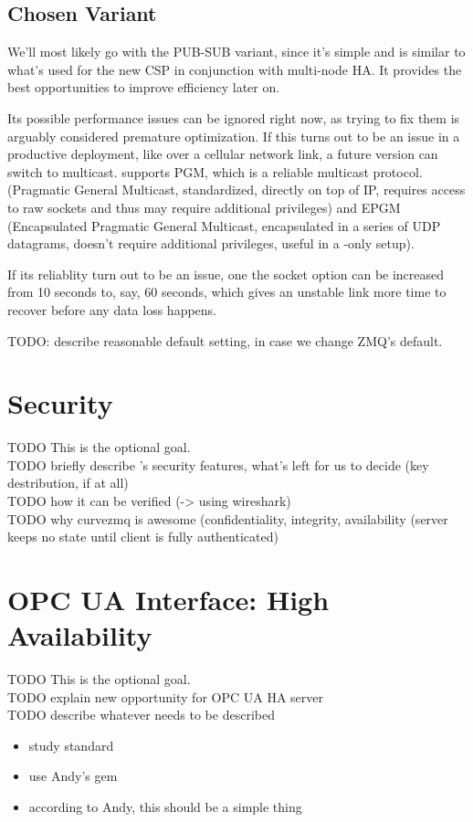\subsection{Chosen Variant}
We'll most likely go with the PUB-SUB variant, since it's simple and is similar to
what's used for the new CSP in conjunction with multi-node HA. It provides the best
opportunities to improve efficiency later on.

Its possible performance issues can be ignored right now, as trying to fix them
is arguably considered premature optimization. If this turns out to be an issue
in a productive deployment, like over a cellular network link, a future version
can switch to multicast. \zmq supports PGM, which is a reliable multicast
protocol. (Pragmatic General Multicast, standardized, directly on top of IP,
requires access to raw sockets and thus may require additional privileges) and
EPGM (Encapsulated Pragmatic General Multicast, encapsulated in a series of UDP
datagrams, doesn't require additional privileges, useful in a \zmq-only setup).

If its reliablity turn out to be an issue, one the socket option
 can be increased from 10 seconds to, say, 60 seconds, which
gives an unstable link more time to recover before any data loss happens.

TODO: describe reasonable default setting, in case we change ZMQ's default.


\section{Security}\label{sec:meth:security}
TODO This is the optional goal.\\
TODO briefly describe \zmq's security features, what's left for us to decide (key destribution, if at all)\\
TODO how it can be verified (-> using wireshark)\\
TODO why curvezmq is awesome (confidentiality, integrity, availability (server keeps no state until client is fully authenticated)




\section{OPC UA Interface: High Availability}\label{sec:meth:opc-ua}
TODO This is the optional goal.\\
TODO explain new opportunity for OPC UA HA server\\
TODO describe whatever needs to be described\\

\begin{itemize}
	\item study standard
	\item use Andy's gem
	\item according to Andy, this should be a simple thing
\end{itemize}
